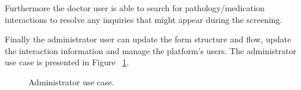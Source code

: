 Furthermore the doctor user is able to search for pathology/medication interactions to resolve any inquiries that might appear during the screening.

Finally the administrator user can update the form structure and flow, update the interaction information and manage the platform's users.
The administrator use case is presented in Figure ~\ref{fig:administrator_use_case}.

\begin{figure}[H]
	\begin{center}
	\end{center}
	\caption{Administrator use case.}\label{fig:administrator_use_case}
\end{figure}